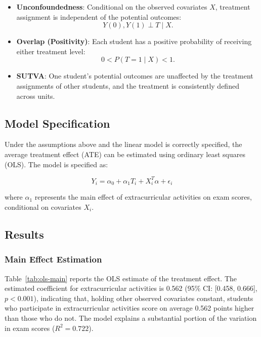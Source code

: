 \documentclass[10pt,letterpaper]{article}
\begin{document}
\begin{itemize}
    \item \textbf{Unconfoundedness}: Conditional on the observed covariates $X$, treatment assignment is independent of the potential outcomes:
    \[
    Y(0), Y(1) \perp T \mid X.
    \]

    \item \textbf{Overlap (Positivity)}: Each student has a positive probability of receiving either treatment level:
    \[
    0 < P(T=1 \mid X) < 1.
    \]

    \item \textbf{SUTVA}: One student’s potential outcomes are unaffected by the treatment assignments of other students, and the treatment is consistently defined across units.
\end{itemize}




\subsection{Model Specification}

Under the assumptions above and the linear model is correctly specified, the average treatment effect (ATE) can be estimated using ordinary least squares (OLS). The model is specified as:

\begin{equation*}
Y_i = \alpha_0 + \alpha_1 T_i + X_i^T \alpha + \epsilon_i
\end{equation*}

where $\alpha_1$ represents the main effect of extracurricular activities on exam scores, conditional on covariates $X_i$.

\subsection{Results}
\subsubsection{Main Effect Estimation}

Table~\ref{tab:ols-main} reports the OLS estimate of the treatment effect. The estimated coefficient for extracurricular activities is 0.562 (95\% CI: [0.458, 0.666], $p < 0.001$), indicating that, holding other observed covariates constant, students who participate in extracurricular activities score on average 0.562 points higher than those who do not. The model explains a substantial portion of the variation in exam scores ($R^2 = 0.722$).
\end{document}
